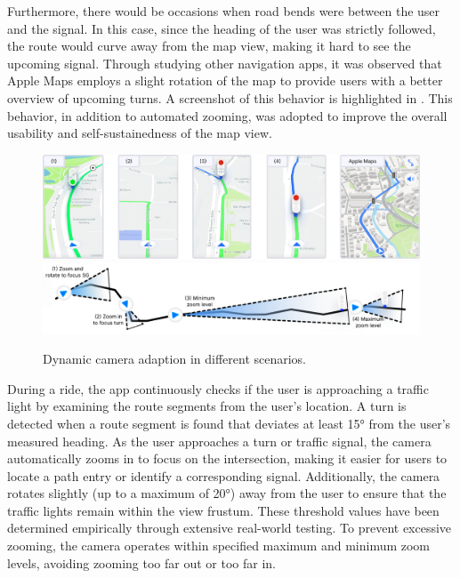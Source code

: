 Furthermore, there would be occasions when road bends were between the user and the signal. In this case, since the heading of the user was strictly followed, the route would curve away from the map view, making it hard to see the upcoming signal. Through studying other navigation apps, it was observed that Apple Maps employs a slight rotation of the map to provide users with a better overview of upcoming turns. A screenshot of this behavior is highlighted in . This behavior, in addition to automated zooming, was adopted to improve the overall usability and self-sustainedness of the map view.

\begin{figure}[htbp]
\centering
\includegraphics[width=\linewidth]{images/camera-controller-1.png}
\includegraphics[width=\linewidth]{images/camera-controller-2.pdf}
\caption{Dynamic camera adaption in different scenarios.}
\label{fig:camera-controller}
\end{figure}

During a ride, the app continuously checks if the user is approaching a traffic light by examining the route segments from the user's location. A turn is detected when a route segment is found that deviates at least 15° from the user's measured heading. As the user approaches a turn or traffic signal, the camera automatically zooms in to focus on the intersection, making it easier for users to locate a path entry or identify a corresponding signal. Additionally, the camera rotates slightly (up to a maximum of 20°) away from the user to ensure that the traffic lights remain within the view frustum. These threshold values have been determined empirically through extensive real-world testing. To prevent excessive zooming, the camera operates within specified maximum and minimum zoom levels, avoiding zooming too far out or too far in.

